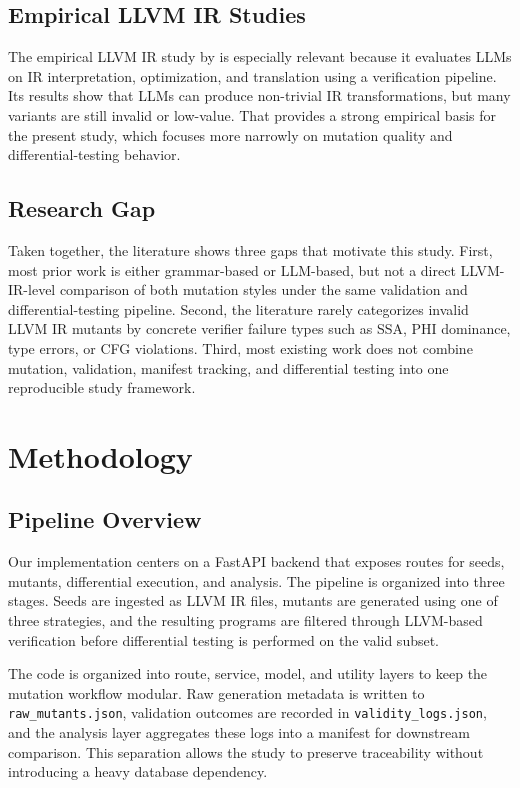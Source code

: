 \documentclass[journal]{IEEEtran}
\begin{document}
\subsection{Empirical LLVM IR Studies}

The empirical LLVM IR study by \cite{llvm_ir_interpretation} is especially relevant because it evaluates LLMs on IR interpretation, optimization, and translation using a verification pipeline. Its results show that LLMs can produce non-trivial IR transformations, but many variants are still invalid or low-value. That provides a strong empirical basis for the present study, which focuses more narrowly on mutation quality and differential-testing behavior.

\subsection{Research Gap}

Taken together, the literature shows three gaps that motivate this study. First, most prior work is either grammar-based or LLM-based, but not a direct LLVM-IR-level comparison of both mutation styles under the same validation and differential-testing pipeline. Second, the literature rarely categorizes invalid LLVM IR mutants by concrete verifier failure types such as SSA, PHI dominance, type errors, or CFG violations. Third, most existing work does not combine mutation, validation, manifest tracking, and differential testing into one reproducible study framework.

\section{Methodology}

\subsection{Pipeline Overview}

Our implementation centers on a FastAPI backend that exposes routes for seeds, mutants, differential execution, and analysis. The pipeline is organized into three stages. Seeds are ingested as LLVM IR files, mutants are generated using one of three strategies, and the resulting programs are filtered through LLVM-based verification before differential testing is performed on the valid subset.

The code is organized into route, service, model, and utility layers to keep the mutation workflow modular. Raw generation metadata is written to \texttt{raw\_mutants.json}, validation outcomes are recorded in \texttt{validity\_logs.json}, and the analysis layer aggregates these logs into a manifest for downstream comparison. This separation allows the study to preserve traceability without introducing a heavy database dependency.
\end{document}
